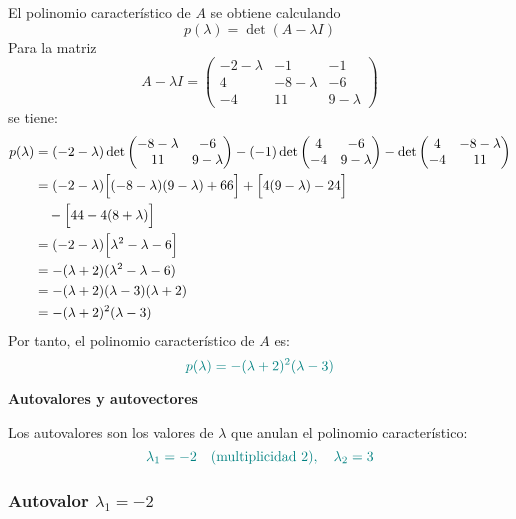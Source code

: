 \documentclass{article}
\begin{document}
\begin{enumerate}[label=\textbf{\alph*)}]
    El polinomio característico de \( A \) se obtiene calculando
    \[
    p(\lambda) = \det(A - \lambda I)
    \]
    Para la matriz
    \[
    A - \lambda I =
    \begin{pmatrix}
    -2-\lambda & -1 & -1 \\
    4 & -8-\lambda & -6 \\
    -4 & 11 & 9-\lambda
    \end{pmatrix}
    \]
    se tiene:
    \[
    \begin{aligned}
    p(\lambda) &= (-2-\lambda)\det
    \begin{pmatrix}
    -8-\lambda & -6 \\
    11 & 9-\lambda
    \end{pmatrix}
    -(-1)\det
    \begin{pmatrix}
    4 & -6 \\
    -4 & 9-\lambda
    \end{pmatrix}
    -\det
    \begin{pmatrix}
    4 & -8-\lambda \\
    -4 & 11
    \end{pmatrix} \\
    &= (-2-\lambda)\Bigl[(-8-\lambda)(9-\lambda)+66\Bigr]
    + \Bigl[4(9-\lambda)-24\Bigr] \\
    &\quad - \Bigl[44-4(8+\lambda)\Bigr] \\
    &= (-2-\lambda)\Bigl[\lambda^2-\lambda-6\Bigr] \\
    &= -(\lambda+2)(\lambda^2-\lambda-6) \\
    &= -(\lambda+2)(\lambda-3)(\lambda+2) \\
    &= -(\lambda+2)^2(\lambda-3)
    \end{aligned}
    \]
    Por tanto, el polinomio característico de \( A \) es:
    \[\color{teal}
    p(\lambda) = -(\lambda+2)^2(\lambda-3)
    \]
    
    \textbf{Autovalores y autovectores}
    
    Los autovalores son los valores de \( \lambda \) que anulan el polinomio característico:
    \[\color{teal}
    \lambda_1 = -2 \quad (\text{multiplicidad 2}), \quad \lambda_2 = 3
    \]
    
    \subsubsection*{Autovalor \( \lambda_1 = -2 \)}
    

\end{enumerate}
\end{document}
